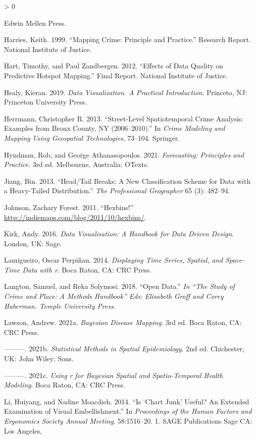 \documentclass[
]{book}
\newlength{\cslhangindent}
\newenvironment{CSLReferences}[2] %
 {%
  \setlength{\parindent}{0pt}
  \ifodd #1 \everypar{\setlength{\hangindent}{\cslhangindent}}\ignorespaces\fi
  \ifnum #2 > 0
  \setlength{\parskip}{#2\baselineskip}
  \fi
 }%
 {}
\begin{document}
\begin{CSLReferences}{1}{0}
Edwin Mellen Press.

\leavevmode\hypertarget{ref-Harries_1999}{}%
Harries, Keith. 1999. {``Mapping Crime: Principle and Practice.''} Research Report. National Institute of Justice.

\leavevmode\hypertarget{ref-Hart_2012}{}%
Hart, Timothy, and Paul Zandbergen. 2012. {``Effects of Data Quality on Predictive Hotspot Mapping.''} Final Report. National Institute of Justice.

\leavevmode\hypertarget{ref-Healy_2019}{}%
Healy, Kieran. 2019. \emph{Data Visualization. A Practical Introduction}. Princeto, NJ: Princeton University Press.

\leavevmode\hypertarget{ref-Herrmann_2013}{}%
Herrmann, Christopher R. 2013. {``Street-Level Spatiotemporal Crime Analysis: Examples from Bronx County, NY (2006--2010).''} In \emph{Crime Modeling and Mapping Using Geospatial Technologies}, 73--104. Springer.

\leavevmode\hypertarget{ref-Hyndman_2021}{}%
Hyndman, Rob, and George Athanasopoulos. 2021. \emph{Forecasting: Principles and Practice}. 3rd ed. Melbourne, Australia: OTexts.

\leavevmode\hypertarget{ref-Jiang_2013}{}%
Jiang, Bin. 2013. {``Head/Tail Breaks: A New Classification Scheme for Data with a Heavy-Tailed Distribution.''} \emph{The Professional Geographer} 65 (3): 482--94.

\leavevmode\hypertarget{ref-Johnson_2011}{}%
Johnson, Zachary Forest. 2011. {``Hexbins!''} \url{http://indiemaps.com/blog/2011/10/hexbins/}.

\leavevmode\hypertarget{ref-Kirk_2016}{}%
Kirk, Andy. 2016. \emph{Data Visualisation: A Handbook for Data Driven Design}. London, UK: Sage.

\leavevmode\hypertarget{ref-Perpinan_2014}{}%
Lamigueiro, Oscar Perpiñan. 2014. \emph{Displaying Time Series, Spatial, and Space-Time Data with r}. Boca Raton, CA: CRC Press.

\leavevmode\hypertarget{ref-Langton_2018}{}%
Langton, Samuel, and Reka Solymosi. 2018. {``Open Data.''} \emph{In {``The Study of Crime and Place: A Methods Handbook''} Eds: Elisabeth Groff and Corey Haberman. Temple University Press.}

\leavevmode\hypertarget{ref-Lawson_2021a}{}%
Lawson, Andrew. 2021a. \emph{Bayesian Disease Mapping}. 3rd ed. Boca Raton, CA: CRC Press.

\leavevmode\hypertarget{ref-Lawson_2006}{}%
---------. 2021b. \emph{Statistical Methods in Spatial Epidemiology}. 2nd ed. Chichester, UK: John Wiley; Sons.

\leavevmode\hypertarget{ref-Lawson_2021b}{}%
---------. 2021c. \emph{Using r for Bayesian Spatial and Spatio-Temporal Health Modeling}. Boca Raton, CA: CRC Press.

\leavevmode\hypertarget{ref-Li_2014}{}%
Li, Huiyang, and Nadine Moacdieh. 2014. {``Is {`Chart Junk'} Useful? An Extended Examination of Visual Embellishment.''} In \emph{Proceedings of the Human Factors and Ergonomics Society Annual Meeting}, 58:1516--20. 1. SAGE Publications Sage CA: Los Angeles, 
\end{CSLReferences}
\end{document}
